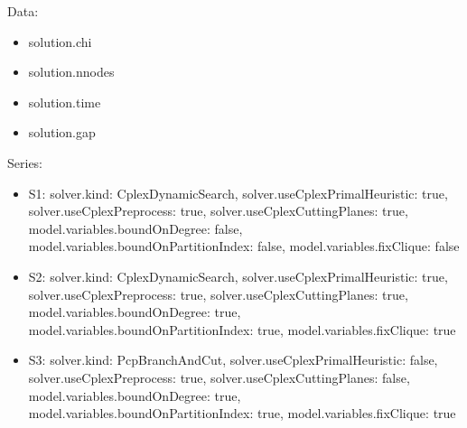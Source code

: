 \documentclass[landscape, 12pt]{report}
\begin{document}
Data:
\begin{itemize}
\item solution.chi
\item solution.nnodes
\item solution.time
\item solution.gap
\end{itemize}
Series:
\begin{itemize}
\item S1: solver.kind: CplexDynamicSearch, solver.useCplexPrimalHeuristic: true, solver.useCplexPreprocess: true, solver.useCplexCuttingPlanes: true, model.variables.boundOnDegree: false, model.variables.boundOnPartitionIndex: false, model.variables.fixClique: false
\item S2: solver.kind: CplexDynamicSearch, solver.useCplexPrimalHeuristic: true, solver.useCplexPreprocess: true, solver.useCplexCuttingPlanes: true, model.variables.boundOnDegree: true, model.variables.boundOnPartitionIndex: true, model.variables.fixClique: true
\item S3: solver.kind: PcpBranchAndCut, solver.useCplexPrimalHeuristic: false, solver.useCplexPreprocess: true, solver.useCplexCuttingPlanes: false, model.variables.boundOnDegree: true, model.variables.boundOnPartitionIndex: true, model.variables.fixClique: true
\end{itemize}
\end{document}
